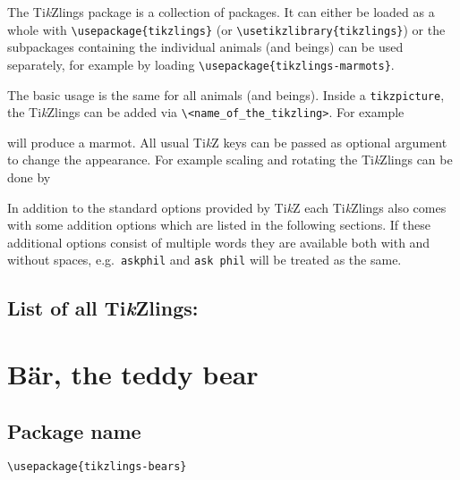 \documentclass[parskip=half]{scrartcl}
\newcommand{\TikZ}{Ti\emph{k}Z\xspace}
\newcommand{\tikzlings}{Ti\emph{k}Zlings\xspace}
\begin{document}
The \tikzlings package is a collection of packages. It can either be loaded as a whole with \lstinline|\usepackage{tikzlings}| (or \lstinline|\usetikzlibrary{tikzlings}|) or the subpackages containing the individual animals (and beings) can be used separately, for example by loading \lstinline|\usepackage{tikzlings-marmots}|.

The basic usage is the same for all animals (and beings). Inside a \lstinline|tikzpicture|, the \tikzlings can be added via \color{duckblue!50!black}\lstinline|\<name_of_the_tikzling>|\color{black}. For example

\begin{tcblisting}{}
\marmot
\end{tcblisting}

will produce a marmot. All usual \TikZ keys can be passed as optional argument to change the appearance. For example scaling and rotating the \tikzlings can be done by

\begin{tcblisting}{}
\coati[rotate=30,scale=0.5]
\end{tcblisting}

In addition to the standard options provided by \TikZ each \tikzlings also comes with some addition options which are listed in the following sections. If these additional options consist of multiple words they are available both with and without spaces, e.g.\ \lstinline|askphil| and \lstinline|ask phil| will be treated as the same.

\subsection*{List of all \tikzlings:}

\begingroup
	\hypersetup{hidelinks}
	\tableofcontents
\endgroup


\clearpage
\section[\textbackslash bear]{B\"ar, the teddy bear}

\subsection{Package name}

\begin{tcolorbox}
\vspace*{0.5cm}
\lstinline|\usepackage{tikzlings-bears}|
\vspace*{0.5cm}
\end{tcolorbox}
\end{document}
